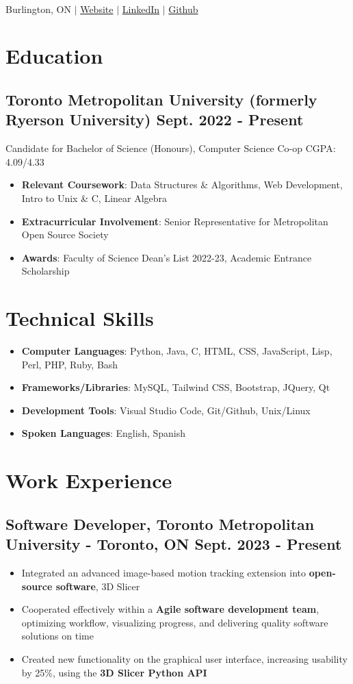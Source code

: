 \documentclass[10pt]{article}
\author{Nicholas Caro Lopez}
\date{May 2023}
\newcommand{\rightindent}[1]{\hfill{\textmd{#1}}}
\newcommand{\job}[3]{
    #1,  %
    \textmd{#2} %
    \hfill{\textmd{#3}} %
}
\renewcommand{\maketitle}{
    \begin{center}
    {\LARGE\bfseries\theauthor\\} %
    \vspace{0.3em} %
    Burlington, ON $\mid$ \href{https://nickcarolopez.ca/}{Website}  $\mid$ \href{https://linkedin.com/in/nicholas-caro-lopez-123738252/}{LinkedIn} $\mid$ \href{https://github.com/nicholas489}{Github}
    \end{center}
    \vspace{-1.2em} %
}
\begin{document}
\maketitle

\section{Education}
\subsection{Toronto Metropolitan University (formerly Ryerson University) \rightindent{Sept. 2022 - Present}}
\vspace{-0.3em}Candidate for Bachelor of Science (Honours), Computer Science Co-op \rightindent{CGPA: 4.09/4.33}
\begin{itemize}
    \item \textbf{Relevant Coursework}: Data Structures \& Algorithms, Web Development, Intro to Unix \& C, Linear Algebra
    \item \textbf{Extracurricular Involvement}: Senior Representative for Metropolitan Open Source Society
    \item \textbf{Awards}: Faculty of Science Dean's List 2022-23, Academic Entrance Scholarship 
\end{itemize}

\section{Technical Skills}
\begin{itemize}
    \item \textbf{Computer Languages}: Python, Java, C, HTML, CSS, JavaScript, Lisp, Perl, PHP, Ruby, Bash
    \item \textbf{Frameworks/Libraries}: MySQL, Tailwind CSS, Bootstrap, JQuery, Qt
    \item \textbf{Development Tools}: Visual Studio Code, Git/Github, Unix/Linux
    \item \textbf{Spoken Languages}: English, Spanish
\end{itemize}

\section{Work Experience}
\subsection{\job{Software Developer}{Toronto Metropolitan University - Toronto, ON}{Sept. 2023 - Present}}
\begin{itemize}
    \item Integrated an advanced image-based motion tracking extension into \textbf{open-source software}, 3D Slicer
    \item Cooperated effectively within a \textbf{Agile software development team}, optimizing workflow, visualizing progress, and delivering quality software solutions on time
    \item Created new functionality on the graphical user interface, increasing usability by 25\%, using the \textbf{3D Slicer Python API}
\end{itemize}
\end{document}
